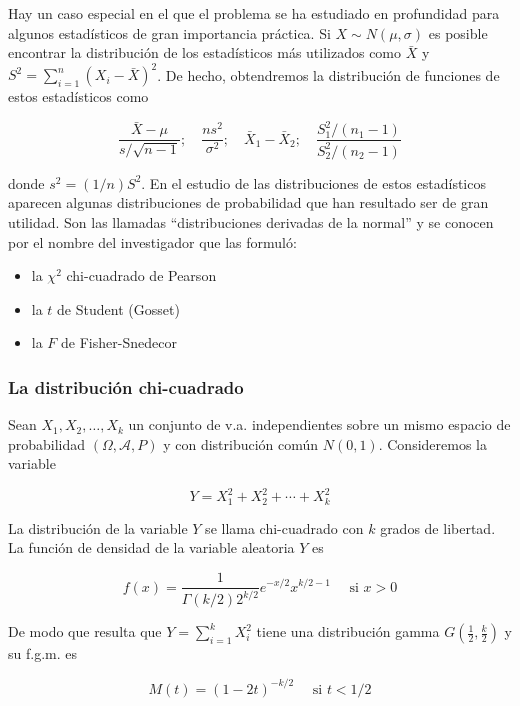 \documentclass[
]{article}
\providecommand{\tightlist}{%
  \setlength{\itemsep}{0pt}\setlength{\parskip}{0pt}}
\begin{document}
Hay un caso especial en el que el problema se ha estudiado en profundidad para algunos estadísticos de gran importancia práctica. Si \(X \sim N(\mu, \sigma)\) es posible encontrar la distribución de los estadísticos más utilizados como \(\bar{X}\) y \(S^{2}=\sum_{i=1}^{n}\left(X_{i}-\bar{X}\right)^{2}\). De hecho, obtendremos la distribución de funciones de estos estadísticos como

\[
\frac{\bar{X}-\mu}{s / \sqrt{n-1}} ; \quad \frac{n s^{2}}{\sigma^{2}} ; \quad \bar{X}_{1}-\bar{X}_{2} ; \quad \frac{S_{1}^{2} /\left(n_{1}-1\right)}{S_{2}^{2} /\left(n_{2}-1\right)}
\]

donde \(s^{2}=(1 / n) S^{2}\).
En el estudio de las distribuciones de estos estadísticos aparecen algunas distribuciones de probabilidad que han resultado ser de gran utilidad. Son las llamadas ``distribuciones derivadas de la normal'' y se conocen por el nombre del investigador que las formuló:

\begin{itemize}
\tightlist
\item
  la \(\chi^{2}\) chi-cuadrado de Pearson
\item
  la \(t\) de Student (Gosset)
\item
  la \(F\) de Fisher-Snedecor
\end{itemize}

\subsubsection{La distribución chi-cuadrado}\label{la-distribuciuxf3n-chi-cuadrado}

Sean \(X_{1}, X_{2}, \ldots, X_{k}\) un conjunto de v.a. independientes sobre un mismo espacio de probabilidad \((\Omega, \mathcal{A}, P)\) y con distribución común \(N(0,1)\). Consideremos la variable

\[
Y=X_{1}^{2}+X_{2}^{2}+\cdots+X_{k}^{2}
\]

La distribución de la variable \(Y\) se llama chi-cuadrado con \(k\) grados de libertad.
La función de densidad de la variable aleatoria \(Y\) es

\[
f(x)=\frac{1}{\Gamma(k / 2) 2^{k / 2}} e^{-x / 2} x^{k / 2-1} \quad \text { si } x>0
\]

De modo que resulta que \(Y=\sum_{i=1}^{k} X_{i}^{2}\) tiene una distribución gamma \(G\left(\frac{1}{2}, \frac{k}{2}\right)\) y su f.g.m. es

\[
M(t)=(1-2 t)^{-k / 2} \quad \text { si } t<1 / 2
\]
\end{document}
